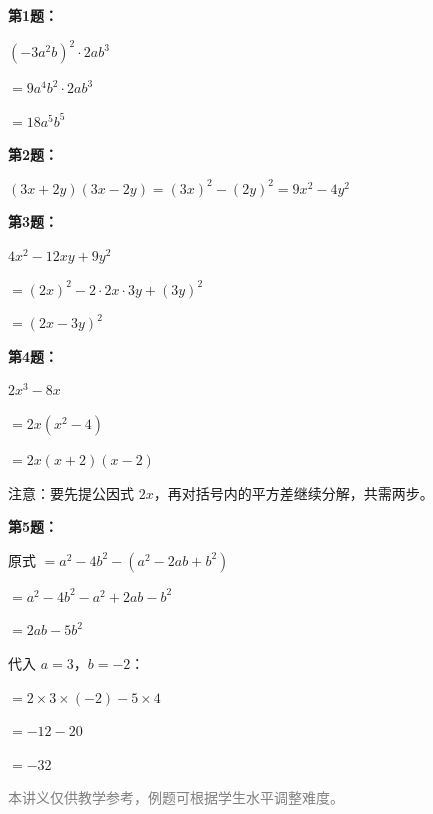 \documentclass[12pt, a4paper]{ctexart}
\begin{document}
\vspace{10pt}

\begin{knowledgebox}[参考答案]

\textbf{第1题：}

$(-3a^2b)^2 \cdot 2ab^3$

$= 9a^4b^2 \cdot 2ab^3$

$= 18a^5b^5$

\medskip
\textbf{第2题：}

$(3x + 2y)(3x - 2y) = (3x)^2 - (2y)^2 = 9x^2 - 4y^2$

\medskip
\textbf{第3题：}

$4x^2 - 12xy + 9y^2$

$= (2x)^2 - 2 \cdot 2x \cdot 3y + (3y)^2$

$= (2x - 3y)^2$

\medskip
\textbf{第4题：}

$2x^3 - 8x$

$= 2x(x^2 - 4)$

$= 2x(x + 2)(x - 2)$

注意：要先提公因式 $2x$，再对括号内的平方差继续分解，共需两步。

\medskip
\textbf{第5题：}

原式 $= a^2 - 4b^2 - (a^2 - 2ab + b^2)$

$= a^2 - 4b^2 - a^2 + 2ab - b^2$

$= 2ab - 5b^2$

代入 $a = 3$，$b = -2$：

$= 2 \times 3 \times (-2) - 5 \times 4$

$= -12 - 20$

$= -32$

\end{knowledgebox}

\vfill
\begin{center}
\small\textcolor{gray}{本讲义仅供教学参考，例题可根据学生水平调整难度。}
\end{center}
\end{document}
